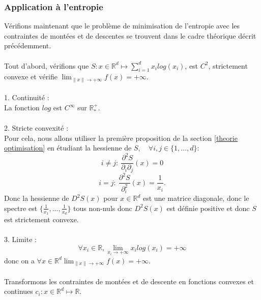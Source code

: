 \documentclass[12pt]{article}
\newcommand{\R}{\mathbb{R}}
\newcommand{\Rd}{\mathbb{R}^d}
\begin{document}
\subsubsection{Application à l'entropie}
Vérifions maintenant que le problème de minimisation de l'entropie avec les contraintes de montées et de descentes se trouvent dans le cadre théorique décrit précédemment.\\
\\
Tout d'abord, vérifions que $S : x \in \Rd \mapsto \sum_{i=1}^dx_ilog(x_i)$, est $C^2$, strictement convexe et vérifie $\lim_{\lVert x\lVert \to +\infty} f(x) = +\infty$.\\
\\
1. Continuité :\\
La fonction $log$ est $C^{\infty}$ sur $\R^+_*$.\\
\\
2. Stricte convexité :\\
Pour cela, nous allons utiliser la première proposition de la section \ref{theorie optimisation} en étudiant la hessienne de $S, \quad \forall i, j \in \{ 1, ...,d\} :$
\[
i \neq j : \: \frac{\partial^2S}{\partial_i\partial_j}(x) = 0
\]
\[
i = j : \: \frac{\partial^2S}{\partial_i^2}(x) = \frac{1}{x_i}.
\]
Donc la hessienne de $D^2S(x)$ pour $x \in \Rd$ est une matrice diagonale, donc le spectre est $\{\frac{1}{x_1},..., \frac{1}{x_d}\}$ tous non-nuls donc $D^2S(x)$ est définie positive et donc $S$ est strictement convexe.\\
\\
3. Limite :\\
\[ \forall x_i \in \R, \lim_{x_i \to +\infty} x_ilog(x_i) = +\infty \]
donc  on a $\forall x \in \Rd \lim_{\lVert x\lVert \to +\infty} f(x) = +\infty$.\\
\\
Transformons les contraintes de montées et de descente en fonctions convexes et continues $c_i : x \in \Rd \mapsto \R$.\\
\end{document}
